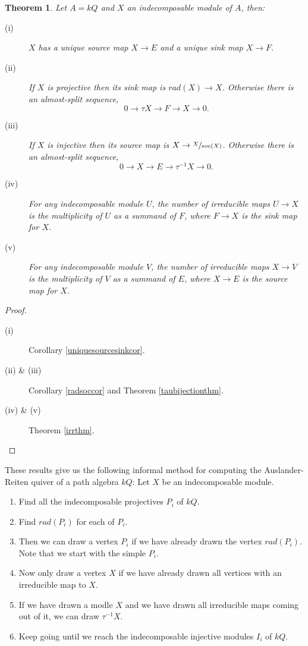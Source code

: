 \documentclass[11.5pt, twoside, a4paper, titlepage]{report}
\theoremstyle{definition}
\theoremstyle{plain}
\newtheorem{thm}[mydef]{Theorem}
\begin{document}
\begin{thm}
Let $A=kQ$ and $X$ an indecomposable module of $A$, then:
\begin{description}
\item [(i)] $X$ has a unique source map $X \to E$ and a unique sink map $X\to F$.
\item [(ii)] If $X$ is projective then its sink map is $rad(X) \to X$. Otherwise there is an almost-split sequence, 
\begin{equation*}
0 \to \tau X \to F \to X \to 0.
\end{equation*}
\item [(iii)] If $X$ is injective then its source map is $X \to \sfrac{X}{soc(X)}$. Otherwise there is an almost-split sequence, 
\begin{equation*}
0 \to X \to E \to \tau^{-1}X \to 0.
\end{equation*}
\item [(iv)] For any indecomposable module $U$, the number of irreducible maps $U \to X$ is the multiplicity of $U$ as a summand of $F$, where $F \to X$ is the sink map for $X$.
\item [(v)] For any indecomposable module $V$, the number of irreducible maps $X \to V$ is the multiplicity of $V$ as a summand of $E$, where $X \to E$ is the source map for $X$.
\end{description}
\end{thm}
\begin{proof}
\begin{description}
\item [(i)] Corollary \ref{uniquesourcesinkcor}.
\item [(ii) \& (iii)] Corollary \ref{radsoccor} and Theorem \ref{taubijectionthm}.
\item [(iv) \& (v)] Theorem \ref{irrthm}.
\end{description}
\end{proof}

These results give us the following informal method for computing the Auslander-Reiten quiver of a path algebra $kQ$: Let $X$ be an indecomposable module.
\begin{enumerate}
\item Find all the indecomposable projectives $P_i$ of $kQ$.
\item Find $rad(P_i)$ for each of $P_i$.
\item Then we can draw a vertex $P_i$ if we have already drawn the vertex $rad(P_i)$. Note that we start with the simple $P_i$.
\item Now only draw a vertex $X$ if we have already drawn all vertices with an irreducible map to $X$.
\item If we have drawn a modle $X$ and we have drawn all irreducible maps coming out of it, we can draw $\tau^{-1}X$.
\item Keep going until we reach the indecomposable injective modules $I_i$ of $kQ$.
\end{enumerate}
\end{document}
